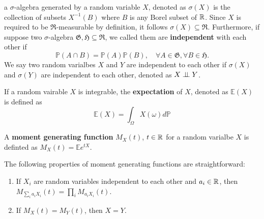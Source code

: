 \begin{definition} a $\sigma$-algebra generated by a random variable $X$, denoted as $\sigma(X)$ is the collection of subsets $X^{-1}(B)$ where $B$ is any Borel subset of $\mathbb{R}$. Since $X$ is required to be $\mathfrak{R}$-measurable by definition, it follows $\sigma(X)\subseteq\mathfrak{R}$. Furthermore, if suppose two $\sigma$-algebra $\mathfrak{G,H}\subseteq\mathfrak{R}$, we called them are \textbf{independent} with each other if
	\begin{equation}
	\mathbb{P}(A\cap B)=\mathbb{P}(A)\mathbb{P}(B),\quad \forall A\in\mathfrak{G}, \forall B\in\mathfrak{H}.
	\end{equation}
We say two random varialbes $X$ and $Y$ are independent to each other if $\sigma(X)$ and $\sigma(Y)$ are independent to each other, denoted as $X\perp\!\!\!\perp Y$.
\end{definition}

\begin{definition}
If a random vairable $X$ is integrable, the \textbf{expectation} of $X$, denoted as $\mathbb{E}(X)$ is defined as
	\begin{equation}
	\mathbb{E}(X)=\int_{\Omega}X(\omega) d\mathbb{P}
	\end{equation}
\end{definition}

\begin{definition}
A \textbf{moment generating function} $M_X(t)$, $t\in\mathbb{R}$ for a random varialbe $X$ is definted as $M_X(t)=\mathbb{E}e^{tX}$.
\end{definition}

\begin{theorem}
The following properties of moment generating functions are straightforward:
	\begin{enumerate}
	\item If $X_i$ are random variables independent to each other and $a_i\in\mathbb{R}$, then $M_{\sum_ia_iX_i}(t)=\prod_i M_{a_iX_i}(t)$.
	\item If $M_X(t)=M_Y(t)$, then $X=Y$.
	\end{enumerate}
\end{theorem}
